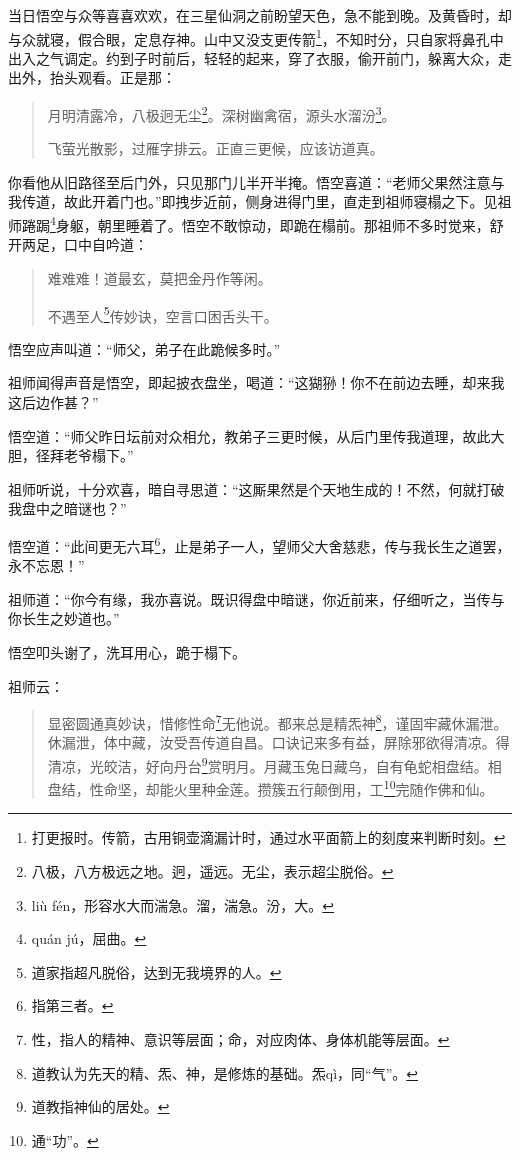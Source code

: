 \documentclass[12pt,UTF8]{ctexbook}
\begin{document}
当日悟空与众等喜喜欢欢，在三星仙洞之前盼望天色，急不能到晚。及黄昏时，却与众就寝，假合眼，定息存神。山中又没支更传箭\footnote{打更报时。传箭，古用铜壶滴漏计时，通过水平面箭上的刻度来判断时刻。}，不知时分，只自家将鼻孔中出入之气调定。约到子时前后，轻轻的起来，穿了衣服，偷开前门，躲离大众，走出外，抬头观看。正是那：

\begin{quotation}
月明清露冷，八极迥无尘\footnote{八极，八方极远之地。迥，遥远。无尘，表示超尘脱俗。}。深树幽禽宿，源头水溜汾\footnote{li\`u f\'en，形容水大而湍急。溜，湍急。汾，大。}。

飞萤光散影，过雁字排云。正直三更候，应该访道真。
\end{quotation}

你看他从旧路径至后门外，只见那门儿半开半掩。悟空喜道：“老师父果然注意与我传道，故此开着门也。”即拽步近前，侧身进得门里，直走到祖师寝榻之下。见祖师踡跼\footnote{qu\'an j\'u，屈曲。}身躯，朝里睡着了。悟空不敢惊动，即跪在榻前。那祖师不多时觉来，舒开两足，口中自吟道：

\begin{quotation}
难难难！道最玄，莫把金丹作等闲。

不遇至人\footnote{道家指超凡脱俗，达到无我境界的人。}传妙诀，空言口困舌头干。
\end{quotation}

悟空应声叫道：“师父，弟子在此跪候多时。”

祖师闻得声音是悟空，即起披衣盘坐，喝道：“这猢狲！你不在前边去睡，却来我这后边作甚？”

悟空道：“师父昨日坛前对众相允，教弟子三更时候，从后门里传我道理，故此大胆，径拜老爷榻下。”

祖师听说，十分欢喜，暗自寻思道：“这厮果然是个天地生成的！不然，何就打破我盘中之暗谜也？”

悟空道：“此间更无六耳\footnote{指第三者。}，止是弟子一人，望师父大舍慈悲，传与我长生之道罢，永不忘恩！”

祖师道：“你今有缘，我亦喜说。既识得盘中暗谜，你近前来，仔细听之，当传与你长生之妙道也。”

悟空叩头谢了，洗耳用心，跪于榻下。

祖师云：

\begin{quotation}
显密圆通真妙诀，惜修性命\footnote{性，指人的精神、意识等层面；命，对应肉体、身体机能等层面。}无他说。都来总是精炁神\footnote{道教认为先天的精、炁、神，是修炼的基础。炁q\`i，同“气”。}，谨固牢藏休漏泄。休漏泄，体中藏，汝受吾传道自昌。口诀记来多有益，屏除邪欲得清凉。得清凉，光皎洁，好向丹台\footnote{道教指神仙的居处。}赏明月。月藏玉兔日藏乌，自有龟蛇相盘结。相盘结，性命坚，却能火里种金莲。攒簇五行颠倒用，工\footnote{通“功”。}完随作佛和仙。
\end{quotation}
\end{document}
